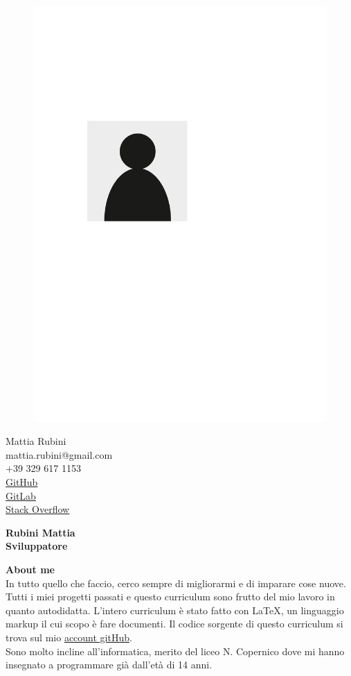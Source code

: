 \documentclass[a4paper,12pt,final]{memoir}
\newcommand{\Sep}{\vspace{1.5em}}
\newenvironment{AboutMe}
	{\ignorespaces\textbf{\color{RoyalBlue} About me}}
	{\Sep\ignorespacesafterend}
\begin{document}
\begin{figure}
	\hfill
	\includegraphics[width=0.6\columnwidth]{photo}
	\vspace{-7cm}
\end{figure}

\begin{flushright}\small
	Mattia Rubini \\
	mattia.rubini@gmail.com \\
	+39 329 617 1153 \\
	\href{https://github.com/Mot93}{GitHub}\\
	\href{https://gitlab.com/mattia.rubini}{GitLab}\\
	\href{https://stackoverflow.com/users/6875945/mattia-rubini}{Stack Overflow}
\end{flushright}\normalsize
\framebreak


\Huge\bfseries {\color{RoyalBlue} Rubini Mattia} \\
\Large\bfseries  Sviluppatore \\

\normalsize\normalfont

\begin{AboutMe}
	\\In tutto quello che faccio, cerco sempre di migliorarmi e di imparare cose nuove.
	Tutti i miei progetti passati e questo curriculum sono frutto del mio lavoro in quanto autodidatta.
	L'intero curriculum è stato fatto con \LaTeX, un linguaggio markup il cui scopo è fare documenti.
	Il codice sorgente di questo curriculum si trova sul mio \href{https://github.com/Mot93/CV-Mattia-Rubini}{account gitHub}.\\
	Sono molto incline all'informatica, merito del liceo N. Copernico dove mi hanno insegnato a programmare già dall'età di 14 anni.
\end{AboutMe}
\end{document}
